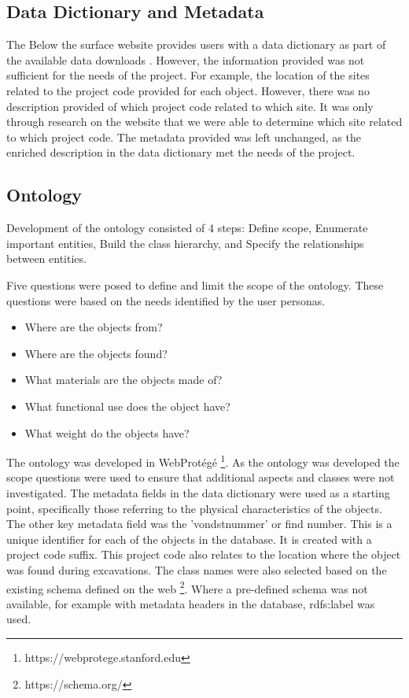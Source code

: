 \subsection{Data Dictionary and Metadata}

The Below the surface website provides users with a data dictionary as part of the available data downloads \cite{belowdata}.  However, the information provided was not sufficient for the needs of the project.  For example, the location of the sites related to the project code provided for each object.  However, there was no description provided of which project code related to which site.  It was only through research on the website that we were able to determine which site related to which project code.  The metadata provided was left unchanged, as the enriched description in the data dictionary met the needs of the project.

\subsection{Ontology} 
Development of the ontology consisted of 4 steps: Define scope, Enumerate important entities, Build the class hierarchy, and Specify the relationships between entities.

Five questions were posed to define and limit the scope of the ontology.  These questions were based on the needs identified by the user personas.
\begin{itemize}
    \item Where are the objects from?
    \item Where are the objects found?
    \item What materials are the objects made of?
    \item What functional use does the object have?
    \item What weight do the objects have?
\end{itemize}

The ontology was developed in WebProtégé \footnote{https://webprotege.stanford.edu}.  As the ontology was developed the scope questions were used to ensure that additional aspects and classes were not investigated. The metadata fields in the data dictionary were used as a starting point, specifically those referring to the physical characteristics of the objects. The other key metadata field was the 'vondstnummer' or find number.  This is a unique identifier for each of the objects in the database.  It is created with a project code suffix.  This project code also relates to the location where the object was found during excavations.  The class names were also selected based on the existing schema defined on the web \footnote{https://schema.org/}.  Where a pre-defined schema was not available, for example with metadata headers in the database, rdfs:label was used.     

